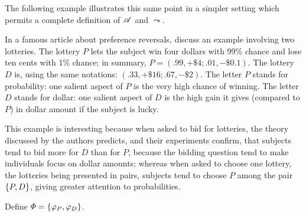 \documentclass[version=last, pagesize, twoside=off, bibliography=totoc, DIV=calc, fontsize=12pt, a4paper, french, english]{scrartcl}
\begin{document}
The following example illustrates this same point in a simpler setting which permits a complete definition of $\mathscr{A}$ and $\leadsto$.%
\begin{example}
	\label{ex:lichtenstein}
	In a famous article about preference reversals, \citet{lichtenstein_reversals_2006} discuss an example involving two lotteries. The lottery $P$ lets the subject win four dollars with 99\% chance and lose ten cents with 1\% chance; in summary, $P = (.99, +\$4; .01, −\$0.1)$. The lottery $D$ is, using the same notations: $(.33, +\$16; .67, −\$2)$. The letter $P$ stands for probability: one salient aspect of $P$ is the very high chance of winning. The letter $D$ stands for dollar: one salient aspect of $D$ is the high gain it gives (compared to $P$) in dollar amount if the subject is lucky.

This example is interesting because when asked to bid for lotteries, the theory discussed by the authors predicts, and their experiments confirm, that subjects tend to bid more for $D$ than for $P$, because the bidding question tend to make individuals focus on dollar amounts; whereas when asked to choose one lottery, the lotteries being presented in pairs, subjects tend to choose $P$ among the pair $\{P, D\}$, giving greater attention to probabilities.

Define $\Phi = \{\varphi_P, \varphi_D\}$.


\end{example}
\end{document}
